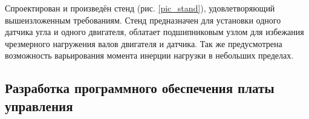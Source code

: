 Спроектирован и произведён стенд (рис. \ref{pic_stand}), удовлетворяющий
вышеизложенным требованиям. Стенд предназначен для установки одного датчика угла
и одного двигателя, облатает подшипниковым узлом для избежания чрезмерного
нагружения валов двигателя и датчика. Так же предусмотрена возможность
варьирования момента инерции нагрузки в небольших пределах.

\newpage
\subsection{Разработка программного обеспечения платы управления}

